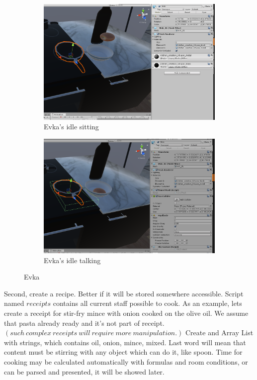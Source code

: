 \documentclass[18pt]{article}
\numberwithin{equation}{section} %
\numberwithin{figure}{section} %
\numberwithin{table}{section} %
\begin{document}
	\begin{figure}[H]
		\centering
		\begin{subfigure}{0.45\textwidth}
			\centering
			\includegraphics[width=1\linewidth]{images/franpan}
			\caption{Evka's idle sitting}
		\end{subfigure}
		\begin{subfigure}{0.45\textwidth}
			\centering
			\includegraphics[width=1\linewidth]{images/franpan_script}
			\caption{Evka's idle talking}
		\end{subfigure}		
		\caption{Evka}
		\label{fig:add_franpan}
	\end{figure}
	
	Second, create a recipe. Better if it will be stored somewhere accessible. Script named $receipts$ contains all current staff possible to cook. As an example, lets create a receipt for stir-fry mince with onion cooked on the olive oil. We assume that pasta already ready and it's not part of receipt. $ \left(such\ complex\ receipts\ will\ require\ more\ manipulation.  \right) $ Create and Array List with strings, which contains oil, onion, mince, mixed. Last word will mean that content must be stirring with any object which can do it, like spoon. Time for cooking may be calculated automatically with formulas and room conditions, or can be parsed and presented, it will be showed later. \\
	
\end{document}
